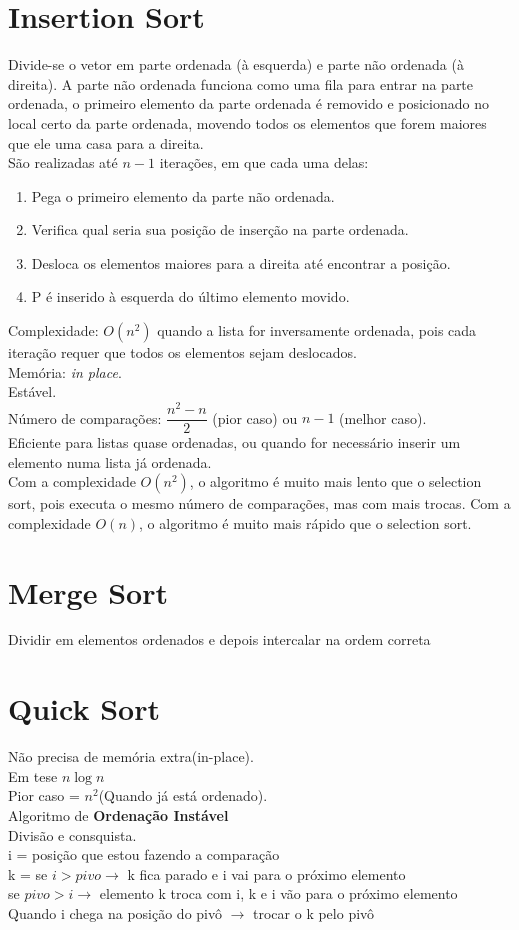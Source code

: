 \documentclass[•]{article}
\begin{document}
	\section{Insertion Sort}
		Divide-se o vetor em parte ordenada (à esquerda) e parte não ordenada (à direita). A parte não ordenada funciona como uma fila para entrar na parte ordenada, o primeiro elemento da parte ordenada é removido e posicionado no local certo da parte ordenada, movendo todos os elementos que forem maiores que ele uma casa para a direita.\\
		São realizadas até $n-1$ iterações, em que cada uma delas:
		\begin{enumerate}
			\item Pega o primeiro elemento da parte não ordenada.
			\item Verifica qual seria sua posição de inserção na parte ordenada.
			\item Desloca os elementos maiores para a direita até encontrar a posição.
			\item P é inserido à esquerda do último elemento movido.
		\end{enumerate}
		Complexidade: $O(n^2)$ quando a lista for inversamente ordenada, pois cada iteração requer que todos os elementos sejam deslocados.\\
		Memória: \textit{in place}.\\
		Estável.\\
		Número de comparações: $\dfrac{n^2-n}{2}$ (pior caso) ou $n-1$ (melhor caso).\\
		Eficiente para listas quase ordenadas, ou quando for necessário inserir um elemento numa lista já ordenada.\\
		Com a complexidade $O(n^2)$, o algoritmo é muito mais lento que o selection sort, pois executa o mesmo número de comparações, mas com mais trocas. Com a complexidade $O(n)$, o algoritmo é muito mais rápido que o selection sort.		
		
	\section{Merge Sort}	
		\begin{center}
			Dividir em elementos ordenados  e depois intercalar na ordem correta
		\end{center}
	\section{Quick Sort}
		Não precisa de memória extra(in-place).\\
		Em tese $n \log n$\\
		Pior caso = $n^2$(Quando já está ordenado).\\
		Algoritmo de \textbf{Ordenação Instável}\\
		Divisão e consquista.\\
		i = posição que estou fazendo a comparação\\
		k = 
		se $i>pivo \to$ k fica parado e i vai para o próximo elemento\\
		se $pivo>i \to$ elemento k troca com i, k e i vão para o próximo elemento\\
		Quando i chega na posição do pivô $\to$ trocar o k pelo pivô
\end{document}
